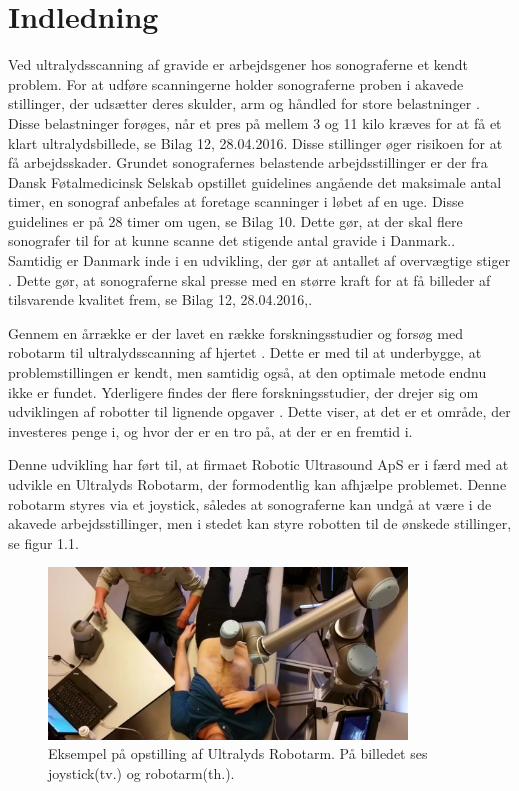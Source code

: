 \chapter{Indledning} 
Ved ultralydsscanning af gravide er arbejdsgener hos sonograferne et kendt problem. For at udføre scanningerne holder sonograferne proben i akavede stillinger, der udsætter deres skulder, arm og håndled for store belastninger \cite{1}\cite{24}\cite{31}\cite{32}\cite{36}. Disse belastninger forøges, når et pres på mellem 3 og 11 kilo kræves for at få et klart ultralydsbillede, se Bilag 12, 28.04.2016. Disse stillinger øger risikoen for at få arbejdsskader. Grundet sonografernes belastende arbejdsstillinger er der fra Dansk Føtalmedicinsk Selskab opstillet guidelines angående det maksimale antal timer, en sonograf anbefales at foretage scanninger i løbet af en uge. Disse guidelines er på 28 timer om ugen, se Bilag 10. Dette gør, at der skal flere sonografer til for at kunne scanne det stigende antal gravide i Danmark.\cite{Foedsler}. \\
Samtidig er Danmark inde i en udvikling, der gør at antallet af overvægtige stiger \cite{Overvaegt}. Dette gør, at sonograferne skal presse med en større kraft for at få billeder af tilsvarende kvalitet frem, se Bilag 12, 28.04.2016,\cite{8}\cite{24}\cite{31}. 

Gennem en årrække er der lavet en række forskningsstudier og forsøg med robotarm til ultralydsscanning af hjertet \cite{5}. Dette er med til at underbygge, at problemstillingen er kendt, men samtidig også, at den optimale metode endnu ikke er fundet. Yderligere findes der flere forskningsstudier, der drejer sig om udviklingen af robotter til lignende opgaver \cite{5}\cite{8}\cite{18}. Dette viser, at det er et område, der investeres penge i, og hvor der er en tro på, at der er en fremtid i. 

Denne udvikling har ført til, at firmaet Robotic Ultrasound ApS er i færd med at udvikle en Ultralyds Robotarm, der formodentlig kan afhjælpe problemet. Denne robotarm styres via et joystick, således at sonograferne kan undgå at være i de akavede arbejdsstillinger, men i stedet kan styre robotten til de ønskede stillinger, se figur 1.1.  

\begin{figure}[H]\centering
	\includegraphics[width = 0.85\textwidth]{Figurer/ergonomiskLosning.jpg}
	\caption{Eksempel på opstilling af Ultralyds Robotarm. På billedet ses joystick(tv.) og robotarm(th.).  }
	\label{ergonomiskLosning}
\end{figure}

